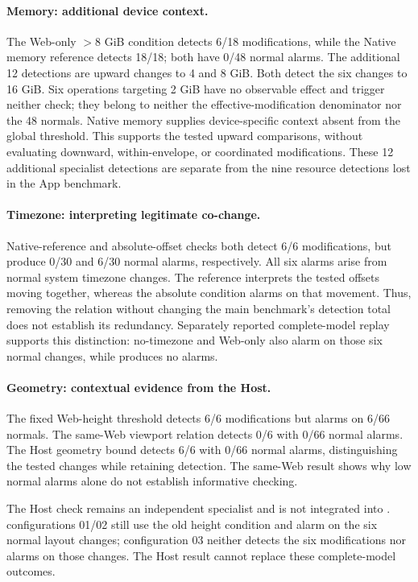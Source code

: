 \paragraph{Memory: additional device context.}
The Web-only $>8$ GiB condition detects 6/18 modifications, while the Native memory reference detects 18/18; both have 0/48 normal alarms. The additional 12 detections are upward changes to 4 and 8 GiB. Both detect the six changes to 16 GiB. Six operations targeting 2 GiB have no observable effect and trigger neither check; they belong to neither the effective-modification denominator nor the 48 normals. Native memory supplies device-specific context absent from the global threshold. This supports the tested upward comparisons, without evaluating downward, within-envelope, or coordinated modifications. These 12 additional specialist detections are separate from the nine resource detections lost in the App benchmark.

\paragraph{Timezone: interpreting legitimate co-change.}
Native-reference and absolute-offset checks both detect 6/6 modifications, but produce 0/30 and 6/30 normal alarms, respectively. All six alarms arise from normal system timezone changes. The reference interprets the tested offsets moving together, whereas the absolute condition alarms on that movement. Thus, removing the relation without changing the main benchmark's detection total does not establish its redundancy. Separately reported complete-model replay supports this distinction: no-timezone and Web-only also alarm on those six normal changes, while \full produces no alarms.

\paragraph{Geometry: contextual evidence from the Host.}
The fixed Web-height threshold detects 6/6 modifications but alarms on 6/66 normals. The same-Web viewport relation detects 0/6 with 0/66 normal alarms. The Host geometry bound detects 6/6 with 0/66 normal alarms, distinguishing the tested changes while retaining detection. The same-Web result shows why low normal alarms alone do not establish informative checking.

The Host check remains an independent specialist and is not integrated into \full. \full configurations 01/02 still use the old height condition and alarm on the six normal layout changes; configuration 03 neither detects the six modifications nor alarms on those changes. The Host result cannot replace these complete-model outcomes.


